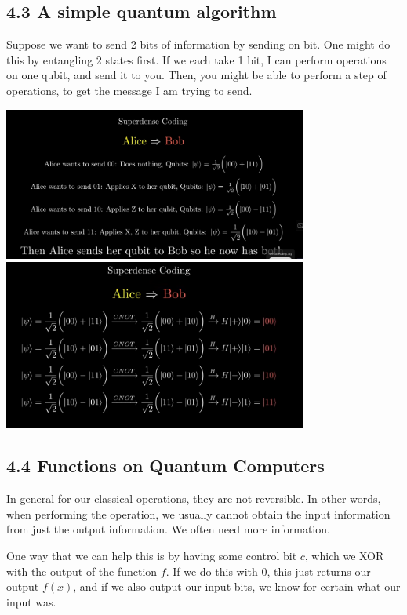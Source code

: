 \documentclass[10pt,oneside,a4paper]{article}
\begin{document}
\subsection*{4.3 A simple quantum algorithm}

Suppose we want to send 2 bits of information by sending on bit. One might do this by entangling 2 states first. If we each take 1 bit, I can perform operations on one qubit, and send it to you. Then, you might be able to perform a step of operations, to get the message I am trying to send. 

\begin{center}
\includegraphics[width=10cm]{7}
\includegraphics[width=10cm]{8}
\end{center}

\subsection*{4.4 Functions on Quantum Computers}

In general for our classical operations, they are not reversible. In other words, when performing the operation, we usually cannot obtain the input information from just the output information. We often need more information. 

One way that we can help this is by having some control bit $c$, which we XOR with the output of the function $f$. If we do this with 0, this just returns our output $f(x)$, and if we also output our input bits, we know for certain what our input was. 
\end{document}
